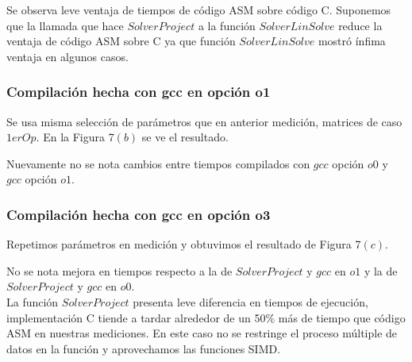 Se observa leve ventaja de tiempos de código ASM sobre código C. 
Suponemos que la llamada que hace $Solver Project$ a la función $Solver Lin Solve$ reduce la ventaja de código ASM sobre C ya que función $Solver Lin Solve$ mostró ínfima ventaja en algunos casos.


\subsubsection{Compilación hecha con gcc en opción o1}
Se usa misma selección de parámetros que en anterior medición, matrices de caso $1erOp$. En la Figura 7$(b)$ se ve el resultado.
 
Nuevamente no se nota cambios entre tiempos compilados con $gcc$ opción $o0$ y $gcc$ opción $o1$. 


\subsubsection{Compilación hecha con gcc en opción o3}
Repetimos parámetros en medición y obtuvimos el resultado de Figura 7$(c)$.
 
No se nota mejora en tiempos respecto a la de $Solver Project$ y $gcc$ en $o1$ y la de $Solver Project$ y $gcc$ en $o0$.
\\


La función $Solver Project$ presenta leve diferencia en tiempos de ejecución, implementación C tiende a tardar alrededor de un 50$\%$ más de tiempo que código ASM en nuestras mediciones. En este caso no se restringe el proceso múltiple de datos en la función y aprovechamos las funciones SIMD.

